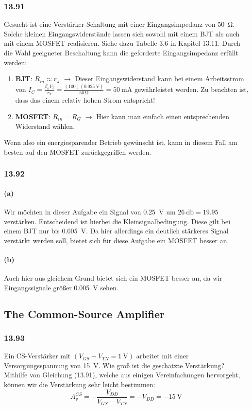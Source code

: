\documentclass[11pt,a4paper,titlepage]{article}
\begin{document}
\subsubsection*{13.91}
Gesucht ist eine Verstärker-Schaltung mit einer Eingangsimpedanz von \SI{50}{\ohm}. Solche kleinen Eingangswiderstände lassen sich sowohl mit einem BJT als auch mit einem MOSFET realisieren. Siehe dazu Tabelle 3.6 in Kapitel 13.11. Durch die Wahl geeigneter Beschaltung kann die geforderte Eingangsimpedanz erfüllt werden:
\begin{enumerate}
	\item \textbf{BJT}: $R_{in} \approx r_{\pi}$ $\rightarrow$ Dieser Eingangswiderstand kann bei einem Arbeitsstrom von $I_C = \frac{\beta_0V_T}{r_{\pi}} = \frac{(100)(\SI{0.025}{\volt})}{\SI{50}{\ohm}} = \SI{50}{\milli\ampere}$ gewährleistet werden. Zu beachten ist, dass das einem relativ hohen Strom entspricht!
	\item \textbf{MOSFET}: $R_{in} = R_G$ $\rightarrow$ Hier kann man einfach einen entsprechenden Widerstand wählen.
\end{enumerate}
Wenn also ein energiesparender Betrieb gewünscht ist, kann in diesem Fall am besten auf den MOSFET zurückgegriffen werden.

\subsubsection*{13.92}
\paragraph{(a)} Wir möchten in dieser Aufgabe ein Signal von \SI{0.25}{\volt} um $\SI{26}{\decibel} = 19.95$ verstärken. Entscheidend ist hierbei die Kleinsignalbedingung. Diese gilt bei einem BJT nur bis \SI{0.005}{\volt}. Da hier allerdings ein deutlich stärkeres Signal verstärkt werden soll, bietet sich für diese Aufgabe ein MOSFET besser an.
\paragraph{(b)} Auch hier aus gleichem Grund bietet sich ein MOSFET besser an, da wir Eingangssignale größer \SI{0.005}{\volt} sehen.

\subsection{The Common-Source Amplifier}
\subsubsection*{13.93}
Ein CS-Verstärker mit $(V_{GS}-V_{TN} = \SI{1}{\volt})$ arbeitet mit einer Versorgungsspannung von \SI{15}{\volt}. Wie groß ist die geschätzte Verstärkung?\\
Mithilfe von Gleichung (13.91), welche aus einigen Vereinfachungen hervorgeht, können wir die Verstärkung sehr leicht bestimmen:
\[ A_v^{CS} = -\frac{V_{DD}}{V_{GS}-V_{TN}} = -V_{DD} = -\SI{15}{\volt}\]
\end{document}
